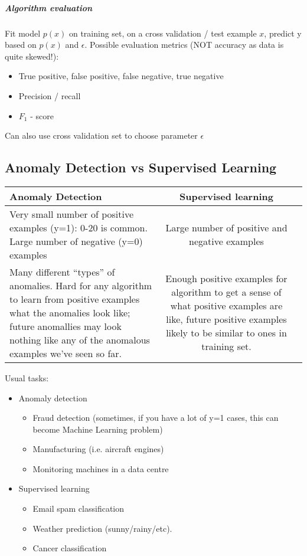 \documentclass{scrartcl}
\begin{document}
\subparagraph{Algorithm evaluation}

Fit model $p(x)$ on training set, on a cross validation / test example
$x$, predict y based on $p(x)$ and $\epsilon$. Possible evaluation
metrics (NOT accuracy as data is quite skewed!):
\begin{itemize}
\item True positive, false positive, false negative, true negative
\item Precision / recall
\item $F_1$ - score
\end{itemize}

Can also use cross validation set to choose parameter $\epsilon$

\subsection{Anomaly Detection vs Supervised Learning}
\label{sec:15-5}

\begin{tabular}{l|c|l}
  Anomaly Detection & Supervised learning \\  
  \hline
  Very small number of positive examples (y=1): 0-20 is common. 
  Large number of negative (y=0) examples & Large number of positive and
  negative examples \\
  Many different ``types'' of anomalies. Hard for any algorithm to learn
  from positive examples what the anomalies look like; future anomallies
  may look nothing like any of the anomalous examples we've seen so far.
  & Enough positive examples for algorithm to get a sense of what
  positive examples are like, future positive examples likely to be
  similar to ones in training set. \\
\end{tabular}
 
Usual tasks:
\begin{itemize}
\item Anomaly detection
  \begin{itemize}
  \item Fraud detection (sometimes, if you have a lot of y=1 cases,
    this can become Machine Learning problem)
  \item Manufacturing (i.e. aircraft engines)
  \item Monitoring machines in a data centre
  \end{itemize}
\item Supervised learning
  \begin{itemize}
  \item Email spam classification
  \item Weather prediction (sunny/rainy/etc).
  \item Cancer classification
  \end{itemize}
\end{itemize}
\end{document}
